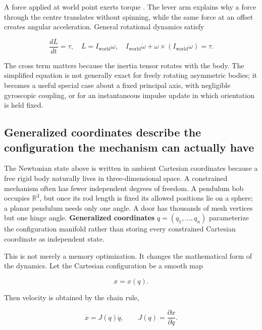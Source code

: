 A force  applied at world point  exerts torque . The lever arm explains why a force through the centre translates without spinning, while the same force at an offset creates angular acceleration. General rotational dynamics satisfy

\[
\frac{dL}{dt}=\tau,\quad L=I_{\mathrm{world}}\omega,\quad
I_{\mathrm{world}}\dot\omega+\omega\times(I_{\mathrm{world}}\omega)=\tau .
\]

The cross term matters because the inertia tensor rotates with the body. The simplified equation  is not generally exact for freely rotating asymmetric bodies; it becomes a useful special case about a fixed principal axis, with negligible gyroscopic coupling, or for an instantaneous impulse update in which orientation is held fixed.

\subsection{Generalized coordinates describe the configuration the mechanism can actually have}\label{02-foundations-ii-ch039-generalized-coordinates-describe-the-configuration-the-mechanism-can-actually-have}

\hypertarget{02-foundations-ii-ch039-generalized-coordinates-describe-the-configuration-the-mechanism-can-actually-have}{}

The Newtonian state above is written in ambient Cartesian coordinates because a free rigid body naturally lives in three-dimensional space. A constrained mechanism often has fewer independent degrees of freedom. A pendulum bob occupies \(\mathbb R^3\), but once its rod length is fixed its allowed positions lie on a sphere; a planar pendulum needs only one angle. A door has thousands of mesh vertices but one hinge angle. \textbf{Generalized coordinates} \(q=(q_1,\ldots,q_n)\) parameterize the configuration manifold rather than storing every constrained Cartesian coordinate as independent state.

This is not merely a memory optimization. It changes the mathematical form of the dynamics. Let the Cartesian configuration be a smooth map

\[
x=x(q).
\]

Then velocity is obtained by the chain rule,

\[
\dot x
=
J(q)\dot q,
\qquad
J(q)=\frac{\partial x}{\partial q}.
\]

